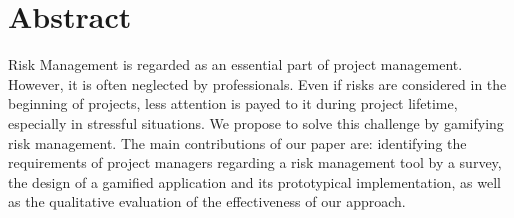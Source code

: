 
{\let\clearpage\relax\chapter*{Abstract}}

Risk Management is regarded as an essential part of project management. However, it is often neglected by professionals. Even if risks are considered in the beginning of projects, less attention is payed to it during project lifetime, especially in stressful situations. 
We propose to solve this challenge by gamifying risk management. 
The main contributions of our paper are:
identifying the requirements of project managers regarding a risk management tool by a survey, 
the design of a gamified application and its prototypical implementation, as well as the qualitative evaluation of the effectiveness of our approach. 
